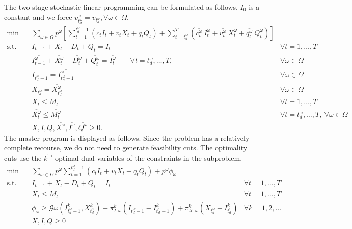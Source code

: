 \documentclass[11pt]{article}
\newcommand{\noi}{\noindent}
\begin{document}
		\noi The two stage stochastic linear programming can be formulated as follows, \(I_0\) is a constant and we force \(\overline{v^\omega_{t_d^\omega}} = v_{t_d^\omega}, \forall \omega \in \Omega\).
		\begin{align*}
			 \min \quad & \sum_{\omega \in \Omega} p^\omega [\sum_{t = 1}^{t_d^\omega-1}{(c_tI_t + v_tX_t + q_tQ_t)} + \sum_{t = t_d^\omega}^{T}{(\overline{c_t^\omega}\ \overline{I_t^\omega} + \overline{v_t^\omega}\ \overline{X_t^\omega} + \overline{q_t^\omega}\ \overline{Q_t^\omega})}] & \\
			 \text{s.t.} \quad & I_{t-1} + X_{t} - D_{t} + Q_{t} = I_{t} & \forall t = 1, \dots, T\\
			& \overline{I_{t-1}^\omega} + \overline{X_{t}^\omega} - \overline{D_{t}^\omega} + \overline{Q_{t}^\omega} = \overline{I_{t}^\omega} \qquad \forall t = t_d^\omega, \dots, T, & \forall \omega \in \Omega \\
			& I_{t_d^\omega-1} = \overline{I_{t_d^\omega -1}^\omega} & \forall \omega \in \Omega \\
			& X_{t_d^\omega} = \overline{X_{t_d^\omega}^\omega} & \forall \omega \in \Omega \\
			& X_t \leq M_t & \forall t = 1, \dots, T\\
			& \overline{X_{t}^\omega} \leq \overline{M_t^\omega} & \forall t = t_d^\omega, \dots, T, \  \forall \omega \in \Omega\\
			& X, I, Q, \overline{X^\omega}, \overline{I^\omega}, \overline{Q^\omega} \geq 0. &
		\end{align*}
		\noi The master program is displayed as follows. Since the problem has a relatively complete recourse, we do not need to generate feasibility cuts. The optimality cuts use the \(k^{\text{th}}\) optimal dual variables of the constraints in the subproblem.
		\begin{align*}
		\min \quad & \sum_{\omega \in \Omega} p^\omega \sum_{t = 1}^{t_d^\omega - 1} (c_t I_t + v_t X_t + q_t Q_t) + p^\omega \phi_\omega & \\
		\text{s.t.} \quad & I_{t-1} + X_t - D_t + Q_t = I_t \quad & \forall t = 1, \dots, T \\
		& X_t \leq M_t & \forall t = 1, \dots, T \\
		& \phi_\omega \geq \mathcal{G}\omega(I_{t_d^\omega - 1}^k,X_{t_d^\omega}^k) + \pi_{I,\omega}^k (I_{t_d^\omega - 1} - I_{t_d^\omega - 1}^k) + \pi_{X,\omega}^k (X_{t_d^\omega} - I_{t_d^\omega}^k) & \forall k = 1,2, \dots\\
		& X,I,Q \geq 0 & 
		\end{align*}
\end{document}
